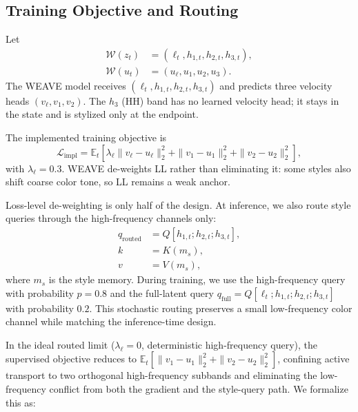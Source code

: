 \documentclass[letterpaper]{article}
\begin{document}
\subsection{Training Objective and Routing}
\label{sec:baselock}

Let
\begin{equation}
\begin{aligned}
\mathcal W(z_t) &= (\ell_t,h_{1,t},h_{2,t},h_{3,t}),\\
\mathcal W(u_t) &= (u_\ell,u_1,u_2,u_3).
\end{aligned}
\end{equation}
The WEAVE model receives $(\ell_t,h_{1,t},h_{2,t},h_{3,t})$ and predicts three velocity heads $(v_\ell,v_1,v_2)$.
The $h_3$ (HH) band has no learned velocity head; it stays in the state and is stylized only at the endpoint.

The implemented training objective is
\begin{equation}
\mathcal L_{\mathrm{impl}}
=
\mathbb E_t\!\left[
\lambda_\ell\|v_\ell-u_\ell\|_2^2
+ \|v_1-u_1\|_2^2
+ \|v_2-u_2\|_2^2
\right],
\label{eq:wdvf-loss}
\end{equation}
with $\lambda_\ell = 0.3$.
WEAVE de-weights LL rather than eliminating it: some styles also shift coarse color tone, so LL remains a weak anchor.

Loss-level de-weighting is only half of the design.
At inference, we also route style queries through the high-frequency channels only:
\begin{equation}
\begin{aligned}
q_{\mathrm{routed}} &= Q[h_{1,t};h_{2,t};h_{3,t}],\\
k &= K(m_s),\\
v &= V(m_s),
\end{aligned}
\label{eq:q-routed}
\end{equation}
where $m_s$ is the style memory.
During training, we use the high-frequency query with probability $p=0.8$ and the full-latent query $q_{\mathrm{full}} = Q[\ell_t;h_{1,t};h_{2,t};h_{3,t}]$ with probability $0.2$.
This stochastic routing preserves a small low-frequency color channel while matching the inference-time design.

In the ideal routed limit ($\lambda_\ell=0$, deterministic high-frequency query), the supervised objective reduces to $\mathbb E_t[\|v_1-u_1\|_2^2 + \|v_2-u_2\|_2^2]$, confining active transport to two orthogonal high-frequency subbands and eliminating the low-frequency conflict from both the gradient and the style-query path.
We formalize this as:
\end{document}
